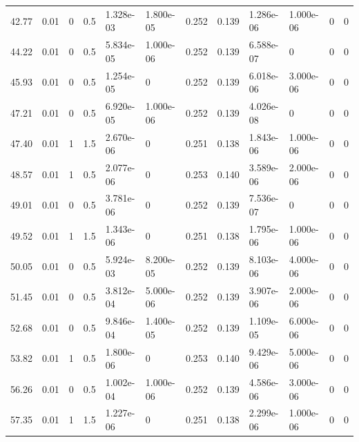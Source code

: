 \documentclass[preview]{standalone}
\begin{document}
{{\begin{tabular}{L{1.2cm}C{1.2cm} C{0.3cm}C{0.5cm} C{1.4cm}C{1.4cm} C{1.4cm}C{1.4cm} C{1.6cm}C{1.6cm} C{1.6cm}C{1.6cm}}
  42.77  &  0.01  & 0     & 0.5 &  1.328e-03  & 1.800e-05  &  0.252&   0.139& 1.286e-06 & 1.000e-06   &  0 & 0  \\ 
  44.22  &  0.01  & 0     & 0.5 &  5.834e-05  & 1.000e-06  &  0.252&   0.139& 6.588e-07 & 0   &  0 & 0  \\ 
  45.93  &  0.01  & 0     & 0.5 &  1.254e-05  & 0  &  0.252&   0.139& 6.018e-06 & 3.000e-06   &  0 & 0  \\ 
  47.21  &  0.01  & 0     & 0.5 &  6.920e-05  & 1.000e-06  &  0.252&   0.139& 4.026e-08 & 0   &  0 & 0  \\ 
  47.40  &  0.01  & 1     & 1.5 &  2.670e-06  & 0  &  0.251&   0.138& 1.843e-06 & 1.000e-06   &  0 & 0  \\ 
  48.57  &  0.01  & 1     & 0.5 &  2.077e-06  & 0  &  0.253&   0.140& 3.589e-06 & 2.000e-06   &  0 & 0  \\ 
  49.01  &  0.01  & 0     & 0.5 &  3.781e-06  & 0  &  0.252&   0.139& 7.536e-07 & 0   &  0 & 0  \\ 
  49.52  &  0.01  & 1     & 1.5 &  1.343e-06  & 0  &  0.251&   0.138& 1.795e-06 & 1.000e-06   &  0 & 0  \\ 
  50.05  &  0.01  & 0     & 0.5 &  5.924e-03  & 8.200e-05  &  0.252&   0.139& 8.103e-06 & 4.000e-06   &  0 & 0  \\ 
  51.45  &  0.01  & 0     & 0.5 &  3.812e-04  & 5.000e-06  &  0.252&   0.139& 3.907e-06 & 2.000e-06   &  0 & 0  \\ 
  52.68  &  0.01  & 0     & 0.5 &  9.846e-04  & 1.400e-05  &  0.252&   0.139& 1.109e-05 & 6.000e-06   &  0 & 0  \\ 
  53.82  &  0.01  & 1     & 0.5 &  1.800e-06  & 0  &  0.253&   0.140& 9.429e-06 & 5.000e-06   &  0 & 0  \\ 
  56.26  &  0.01  & 0     & 0.5 &  1.002e-04  & 1.000e-06  &  0.252&   0.139& 4.586e-06 & 3.000e-06   &  0 & 0  \\ 
  57.35  &  0.01  & 1     & 1.5 &  1.227e-06  & 0  &  0.251&   0.138& 2.299e-06 & 1.000e-06   &  0 & 0  \\ 
\hline 
\end{tabular} 

}}
\end{document}
